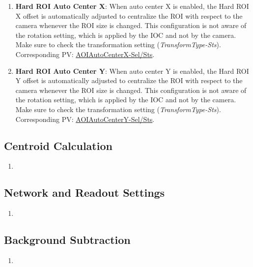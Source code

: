 \documentclass[openany]{article}
\begin{document}
\begin{enumerate}
            \item \textbf{Hard ROI Auto Center X}: When auto center X is enabled, the Hard ROI X offset is automatically adjusted to centralize the ROI with respect to the camera whenever the ROI size is changed. This configuration is not aware of the rotation setting, which is applied by the IOC and not by the camera. Make sure to check the transformation setting (\emph{TransformType-Sts}). Corresponding PV: \hyperlink{pv:hard-roi-auto-center-x}{AOIAutoCenterX-Sel/Sts}.
            \item \textbf{Hard ROI Auto Center Y}: When auto center Y is enabled, the Hard ROI Y offset is automatically adjusted to centralize the ROI with respect to the camera whenever the ROI size is changed. This configuration is not aware of the rotation setting, which is applied by the IOC and not by the camera. Make sure to check the transformation setting (\emph{TransformType-Sts}). Corresponding PV: \hyperlink{pv:hard-roi-auto-center-y}{AOIAutoCenterY-Sel/Sts}.
        \end{enumerate}

    \subsection{Centroid Calculation}\label{sec:centroid-calc}

        \begin{enumerate}
            \item \textbf{}
        \end{enumerate}

    \subsection{Network and Readout Settings}\label{sec:network-and-readout}

        \begin{enumerate}
            \item \textbf{}
        \end{enumerate}

    \subsection{Background Subtraction}\label{sec:background-sub}

        \begin{enumerate}
            \item \textbf{}
        \end{enumerate}
\end{document}
